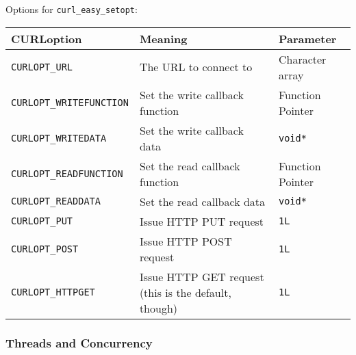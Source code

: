 \documentclass[legalpaper,10pt]{article}
\begin{document}
Options for \texttt{curl\_easy\_setopt}:\\
\begin{tabular}{l|l|l}
	\textbf{CURLoption} & \textbf{Meaning} & \textbf{Parameter} \\ \hline
	\texttt{CURLOPT\_URL} & The URL to connect to & Character array \\ \hline
	\texttt{CURLOPT\_WRITEFUNCTION} & Set the write callback function & Function Pointer \\ \hline
	\texttt{CURLOPT\_WRITEDATA} & Set the write callback data & \texttt{void*} \\ \hline
	\texttt{CURLOPT\_READFUNCTION} & Set the read callback function & Function Pointer \\ \hline
	\texttt{CURLOPT\_READDATA} & Set the read callback data & \texttt{void*} \\ \hline
	\texttt{CURLOPT\_PUT} & Issue HTTP PUT request & \texttt{1L}\\ \hline
	\texttt{CURLOPT\_POST} & Issue HTTP POST request & \texttt{1L}\\ \hline
	\texttt{CURLOPT\_HTTPGET} & Issue HTTP GET request (this is the default, though) & \texttt{1L}\\ 
\end{tabular}

\newpage
\subsubsection*{Threads and Concurrency}
\end{document}
